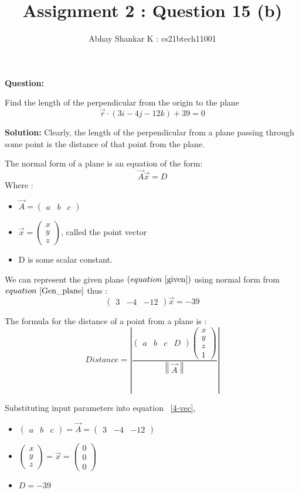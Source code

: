 \documentclass[11pt, oneside, twocolumn, reqno]{article}   	%
\title{Assignment 2 : Question 15 (b)}
\author{Abhay Shankar K : cs21btech11001}
\newcommand{\myvec}[1]{\ensuremath{\begin{pmatrix}#1\end{pmatrix}}}
\providecommand{\norm}[1]{\left\lVert#1\right\rVert}
\providecommand{\abs}[1]{\left\vert#1\right\vert}
\providecommand{\brak}[1]{\ensuremath{\left(#1\right)}}
\newcommand{\question}{\noindent \textbf{Question: }}
\newcommand{\solution}{\noindent \textbf{Solution: }}
\begin{document}
\maketitle

\question

Find the length of the perpendicular from the origin to the plane 
\begin{equation} \label{given}
\vec{r} \cdot \brak{3i - 4j - 12k} + 39 = 0
\end{equation}

\solution
Clearly, the length of the perpendicular from a plane passing through some point is the distance of that point from the plane.

The normal form of a plane is an equation of the form:
\begin{equation}\label{Gen_plane}
\vec{A}\vec{x} = D
\end{equation}
Where :
\begin{itemize}
\item $\vec{A} = \myvec{a & b & c}$
\item $\vec{x} = \myvec{x \\ y \\ z}$, called the point vector
\item D is some scalar constant.
\end{itemize}

We can represent the given plane \brak{equation ~\eqref{given}} using normal form from $equation ~\eqref{Gen_plane}$ thus :
\begin{equation} \label{normal_form}
\myvec{3 & -4 & -12} \vec{x} = -39
\end{equation}

The formula for the distance of a point from a plane is :
\begin{equation} \label{4-vec}
Distance = \abs{\frac{\myvec{a & b & c & D} \myvec{x \\ y \\ z \\ 1}}{\norm{\vec{A}}}}
\end{equation}

Substituting input parameters into equation ~\eqref{4-vec},
\begin{itemize}
\item $\myvec{a & b & c} = \vec{A} = \myvec{3 & -4 & -12}$
\item $\myvec{x \\ y \\ z} = \vec{x} = \myvec{0 \\ 0 \\ 0}$
\item $D = -39$
\end{itemize}
\end{document}
